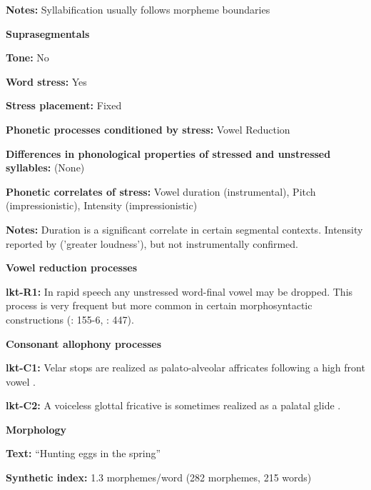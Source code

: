 \textbf{Notes:} Syllabification usually follows morpheme boundaries



\textbf{Suprasegmentals}



\textbf{Tone:} No



\textbf{Word stress:} Yes



\textbf{Stress placement:} Fixed



\textbf{Phonetic processes conditioned by stress:} Vowel Reduction



\textbf{Differences in phonological properties of stressed and unstressed syllables:} (None)



\textbf{Phonetic correlates of stress:} Vowel duration (instrumental), Pitch (impressionistic), Intensity (impressionistic)



\textbf{Notes:} Duration is a significant correlate in certain segmental contexts. Intensity reported by \citet{UllrichEtAl2008} (’greater loudness’), but not instrumentally confirmed.



\textbf{Vowel reduction processes}



\textbf{lkt-R1:} In rapid speech any unstressed word-final vowel may be dropped. This process is very frequent but more common in certain morphosyntactic constructions (\citealt{Mirzayan2010}: 155-6, \citealt{TaylorRood1996}: 447).



\textbf{Consonant allophony processes}



\textbf{lkt-C1:} Velar stops are realized as palato-alveolar affricates following a high front vowel \citep[6]{Ingham2005}.



\textbf{lkt-C2:} A voiceless glottal fricative is sometimes realized as a palatal glide \citep{Ingham2005}.



\textbf{Morphology}



\textbf{Text:} “Hunting eggs in the spring” \citep[95-96]{Ingham2003}



\textbf{Synthetic index:} 1.3 morphemes/word (282 morphemes, 215 words)




